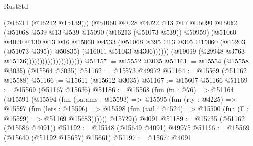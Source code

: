 \begin{lexlean}{RustStd}
\begin{coremodule}
                                                  (@16211 (@16212 @15139)))
                                                (@51060
                                                  @4028
                                                  @4022
                                                  @13
                                                  @17
                                                  @15090
                                                  @15062
                                                  (@51068
                                                    @539
                                                    @13
                                                    @539
                                                    @15090
                                                    (@16203 (@51073 @539))
                                                    @50959)
                                                  (@51060
                                                    @4020
                                                    @130
                                                    @13
                                                    @16
                                                    @15060
                                                    @4533
                                                    (@51068
                                                      @395
                                                      @13
                                                      @395
                                                      @15060
                                                      (@16203 (@51073 @395))
                                                      @50835)
                                                    (@16011 @51043 @4306))))))
                                          (@19069 (@29948 @3763 @15136)))))))))))))))))))))
@51157 := @15552 @3035
@51161 := @15554 (@15558 @3035) (@15564 @3035)
@51162 := @15573 @49972
@51164 := @15569 (@51162 @15588)
@51166 := @15611 (@15612 @3035)
@51167 := @15607 @51166
@51169 := @15569 (@51167 @15636)
@51186 := @15568
    (fun (fn : @76) =>
    @51164
      (@15591
        (@15594
          (fun (params : @15593) =>
          @15595
            (fun (rty : @4225) =>
            @15597
              (fun (lets : @15596) =>
              @15598 (fun (tail : @4524) => @15600 (fun (Γ : @15599) => @51169 @15683))))))
        @15729))
    @4091
@51189 := @15735 (@51162 (@15586 @4091))
@51192 := @15648 (@15649 @4091) @49975
@51196 := @15569 (@15640 (@51192 @15657) @15661)
@51197 := @15674 @4091

\end{coremodule}
\end{lexlean}
